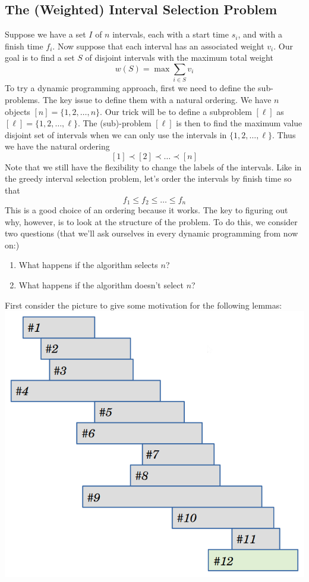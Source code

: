 \documentclass{article}
\begin{document}
\subsection{The (Weighted) Interval Selection Problem}
Suppose we have a set $I$ of $n$ intervals, each with a start time $s_i$, and with a finish time $f_i$. Now suppose that each interval has an associated weight $v_i$. Our goal is to find a set $S$ of disjoint intervals with the maximum total weight
\[w(S) = \max\sum_{i \in S} v_i\]
To try a dynamic programming approach, first we need to define the sub-problems. The key issue to define them with a natural ordering. We have $n$ objects $[n] = \{1, 2, \dots, n\}$. Our trick will be to define a subproblem $[\ell]$ as $[\ell] = \{1, 2, \dots, \ell\}$. The (sub)-problem $[\ell]$ is then to find the maximum value disjoint set of intervals when we can only use the intervals in $\{1, 2, \dots, \ell\}$. Thus we have the natural ordering
\[[1] \prec [2] \prec \dots \prec [n]\]
Note that we still have the flexibility to change the labels of the intervals. Like in the greedy interval selection problem, let's order the intervals by finish time so that
\[f_1 \leq f_2 \leq \dots \leq f_n\]
This is a good choice of an ordering because it works. The key to figuring out why, however, is to look at the structure of the problem. To do this, we consider two questions (that we'll ask ourselves in every dynamic programming from now on:)
\begin{enumerate}
	\item What happens if the algorithm selects $n$?
	\item What happens if the algorithm doesn't select $n$?
\end{enumerate}
First consider the picture to give some motivation for the following lemmas:
\includegraphics[scale=0.475]{ints1}
\end{document}
